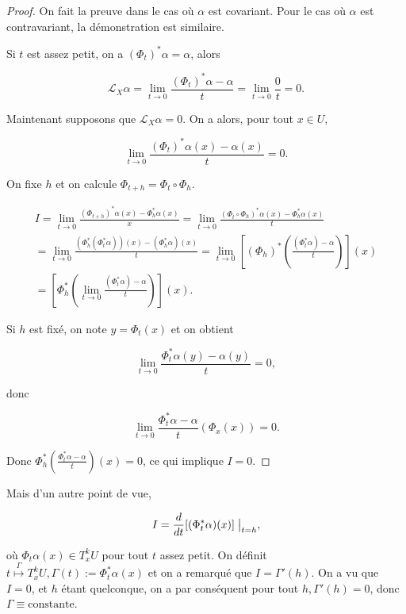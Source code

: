 \documentclass[french]{article}
\theoremstyle{definition}
\begin{document}
\begin{proof}
  On fait la preuve dans le cas où \(\alpha\) est covariant. Pour le cas où \(\alpha\) est contravariant, la démonstration est similaire.

  Si \(t\) est assez petit, on a \((\Phi_t)^{*}\alpha = \alpha\), alors

  \[\mathcal{L}_X \alpha = \lim_{t \to 0}\frac{(\Phi_t)^{*} \alpha - \alpha}{t} = \lim_{t \to 0} \frac{0}{t}=0.\]

  Maintenant supposons que \(\mathcal{L}_X \alpha = 0\). On a alors, pour tout \(x \in U\),

  \[\lim_{t \to 0}\frac{(\Phi_t)^{*} \alpha(x)- \alpha(x)}{t}=0.\]

  On fixe \(h\) et on calcule \(\Phi _{t+h} = \Phi_t \circ \Phi_h\).

  \begin{gather*}
    I = \lim_{t \to 0}\frac{(\Phi _{t+h})^{*}\alpha(x)-\Phi_h ^{*}\alpha(x)}{x} = \lim_{t \to 0} \frac{(\Phi_t \circ \Phi_h)^{*} \alpha(x)- \Phi_h ^{*}\alpha(x)}{t} \\
    = \lim_{t \to 0} \frac{(\Phi_h ^{*}(\Phi_t ^{*} \alpha))(x) - (\Phi_h ^{*} \alpha)(x)}{t}   = \lim_{t \to 0}\left[(\Phi_h)^{*} \left(\frac{(\Phi_t ^{*} \alpha) - \alpha}{t}\right)\right](x)\\
    = \left[\Phi_h ^{*} \left(\lim_{t \to 0}\frac{(\Phi_t ^{*} \alpha)-\alpha}{t} \right)\right](x).
  \end{gather*}

  Si \(h\) est fixé, on note \(y = \Phi_t(x)\) et on obtient

  \[\lim_{t \to 0}\frac{\Phi_t ^{*}\alpha(y) - \alpha(y)}{t}=0,\]

  donc

  \[\lim_{t \to 0} \frac{\Phi_t ^{*} \alpha - \alpha}{t}(\Phi_x (x))=0.\]

  Donc \(\Phi_h ^{*}\left(\displaystyle \frac{\Phi_t ^{*}\alpha- \alpha}{t} \right)(x)=0\), ce qui implique \(I=0\).
\end{proof}

Mais d'un autre point de vue,

\[I = \frac{d}{dt}[(\Phi_t ^{*}\alpha)(x)]\bigm|_{t=h},\]

où \(\Phi_t \alpha(x) \in T_x ^{k} U\) pour tout \(t\) assez petit. On définit \(t \stackrel{\Gamma}{\longmapsto}T_x ^{k}U, \Gamma(t):=\Phi_t ^{*} \alpha(x)\) et on a remarqué que \(I = \Gamma'(h)\). On a vu que \(I=0\), et \(h\) étant quelconque, on a par conséquent pour tout \(h, \Gamma'(h)=0\), donc \(\Gamma \equiv \text{constante}.\)
\end{document}
